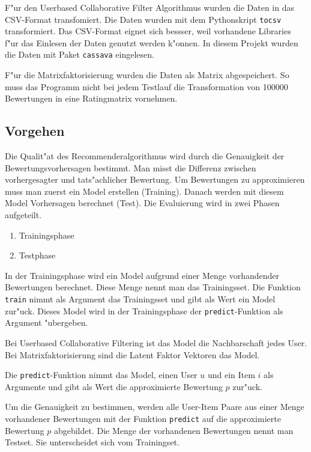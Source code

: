 \documentclass[a4paper, 12pt]{article}
\begin{document}
F"ur den Userbased Collaborative Filter Algorithmus wurden die Daten in das CSV-Format transfomiert. Die Daten wurden mit dem Pythonskript \verb|tocsv| transformiert. Das CSV-Format eignet sich bessser, weil vorhandene Libraries f"ur das Einlesen der Daten genutzt werden k"onnen. In diesem Projekt wurden die Daten mit Paket \verb|cassava| eingelesen.

F"ur die Matrixfaktorisierung wurden die Daten als Matrix abgespeichert. So muss das Programm nicht bei jedem Testlauf die Transformation von 100000 Bewertungen in eine Ratingmatrix vornehmen.

\subsection{Vorgehen}
\label{sec:procedure}

Die Qualit"at des Recommenderalgorithmus wird durch die Genauigkeit der Bewertungsvorhersagen bestimmt. Man misst die Differenz zwischen vorhergesagter und tats"achlicher Bewertung. 
Um Bewertungen zu approximieren muss man zuerst ein Model erstellen (Training). Danach werden mit diesem Model Vorhersagen berechnet (Test). Die Evaluierung wird in zwei Phasen aufgeteilt. 

\begin{enumerate}
\item Trainingsphase
\item Testphase
\end{enumerate}

In der Trainingsphase wird ein Model aufgrund einer Menge vorhandender Bewertungen berechnet. Diese Menge nennt man das Trainingsset. Die Funktion \verb|train| nimmt als Argument das Trainingsset und gibt als Wert ein Model zur"uck. Dieses Model wird in der Trainingsphase der \verb|predict|-Funktion als Argument "ubergeben. 

Bei Userbased Collaborative Filtering ist das Model die Nachbarschaft jedes User. Bei Matrixfaktorisierung sind die Latent Faktor Vektoren das Model.

Die \verb|predict|-Funktion nimmt das Model, einen User $u$ und ein Item $i$ als Argumente und gibt als Wert die approximierte Bewertung $p$ zur"uck.

Um die Genauigkeit zu bestimmen, werden alle User-Item Paare aus einer Menge vorhandener Bewertungen mit der Funktion \verb|predict| auf die approximierte Bewertung $p$ abgebildet. Die Menge der vorhandenen Bewertungen nennt man Testset. Sie unterscheidet sich vom Trainingset.
\end{document}
